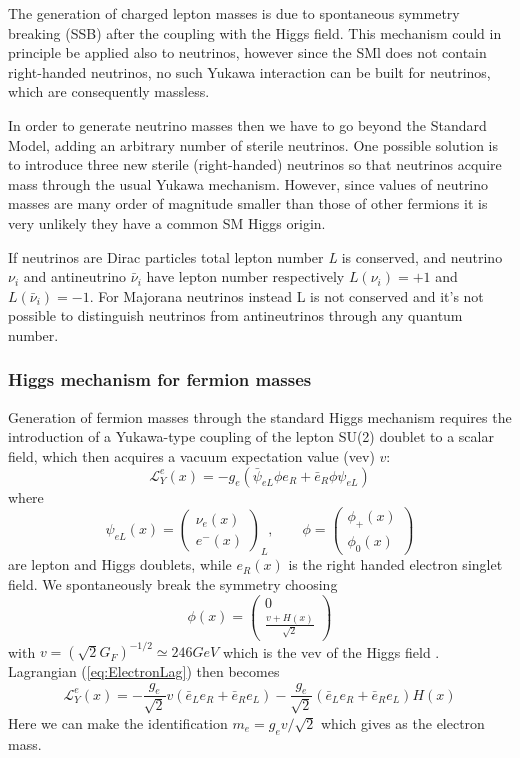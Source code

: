 \documentclass{subnucbo}
\begin{document}
The generation of charged lepton masses is due to spontaneous symmetry breaking (SSB) after the coupling with the Higgs field.
This mechanism could in principle be applied also to neutrinos, however since the SMl does not contain right-handed neutrinos, no such Yukawa interaction can be built for neutrinos, which are consequently massless.

In order to generate neutrino masses then we have to go beyond the Standard Model, adding an arbitrary number of sterile neutrinos.
One possible solution is to introduce three new sterile (right-handed) neutrinos so that neutrinos acquire mass through the usual Yukawa mechanism.  However, since values of neutrino masses are many order of magnitude smaller than those of other fermions it is very unlikely they have a common SM Higgs origin.

If neutrinos are Dirac particles total lepton number \emph{L} is conserved, and neutrino $\nu_i$ and antineutrino $\bar{\nu}_i$ have lepton number respectively  $L(\nu_i)=+1$ and $L(\bar{\nu}_i)=-1$.
For Majorana neutrinos instead L is not conserved and it's not possible to distinguish neutrinos from antineutrinos through any quantum number.

\subsubsection{Higgs mechanism for fermion masses}
Generation of fermion masses through the standard Higgs mechanism requires the introduction of a Yukawa-type coupling of the lepton SU(2) doublet to a scalar field, which then acquires a vacuum expectation value (vev) $v$: 
\begin{equation}
\label{eq:ElectronLag}
\mathcal{L}_Y^e(x)=-g_e(\bar{\psi}_{eL}\phi e_R+\bar{e}_R\phi \psi_{eL}) 
\end{equation}
where
\begin{equation}
\psi_{eL}(x)=\begin{pmatrix}\nu_{e}(x)\\ e^-(x) \end{pmatrix}_L,\qquad
\phi=\begin{pmatrix}\phi_+(x)\\ \phi_0(x) \end{pmatrix}
\end{equation}
are lepton and Higgs doublets, while $e_R(x)$ is the right handed electron singlet field.
We spontaneously break the symmetry choosing 
\begin{equation}
\phi(x)=\begin{pmatrix}0\\ \frac{v+H(x)}{\sqrt{2}}\end{pmatrix}
\end{equation}
with $v=(\sqrt{2}G_F)^{-1/2}\simeq246GeV$ which is the vev of the Higgs field \cite{ref:Halzen}.
Lagrangian (\ref{eq:ElectronLag}) then becomes
\begin{equation}
\mathcal{L}_Y^e(x)=-\frac{g_e}{\sqrt{2}}v(\bar{e}_Le_R+\bar{e}_Re_L)-\frac{g_e}{\sqrt{2}}(\bar{e}_Le_R+\bar{e}_Re_L)H(x)
\end{equation}
Here we can make the identification $m_e=g_ev/\sqrt{2}$ which gives as the electron mass.
\end{document}
